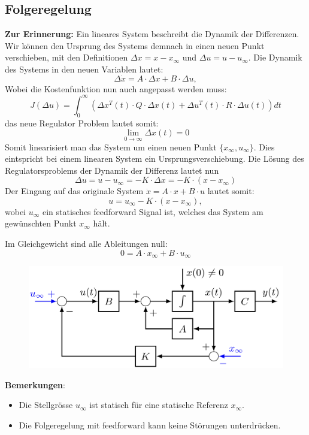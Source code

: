 \subsection{Folgeregelung}
        
        \textbf{Zur Erinnerung:} Ein lineares System beschreibt die Dynamik der Differenzen. Wir können den Ursprung des Systems demnach in einen neuen Punkt verschieben, mit den Definitionen $\Delta x = x -x_\infty$ und $\Delta u = u - u_\infty.$ Die Dynamik des Systems in den neuen Variablen lautet:
        \[\Delta\dot x = A \cdot \Delta x + B \cdot \Delta u,\]
        Wobei die Kostenfunktion nun auch angepasst werden muss:
        \[J(\Delta u) = \int^\infty_0(\Delta x^T(t) \cdot Q \cdot \Delta x(t) + \Delta u^T(t) \cdot R \cdot \Delta u(t)) dt \]
        das neue Regulator Problem lautet somit: 
        \[\lim\limits_{0 \to \infty} \Delta x(t) = 0 \]
        Somit linearisiert man das System um einen neuen Punkt $\{x_\infty,u_\infty\}$. Dies eintspricht bei einem linearen System ein Ursprungsverschiebung. Die Lösung des Regulatorsproblems der Dynamik der Differenz lautet nun
        \[\Delta u = u - u _\infty = -K \cdot \Delta x = -K \cdot ( x-x_\infty)\]
        Der Eingang auf das originale System $\dot x = A\cdot x + B \cdot u$ lautet somit:
        \[u = u_\infty - K \cdot (x-x_\infty),\]
        wobei $u_\infty$ ein statisches feedforward Signal ist, welches das System am gewünschten Punkt $x_\infty$ hält. 
        
        Im Gleichgewicht sind alle Ableitungen null: \[ 0 = A\cdot x_{\infty} + B \cdot u_\infty\]
        
        \begin{figure}[H]
            \centering
            \includegraphics[width = 0.6\linewidth]{images/08/LQR_Folgeregelung.jpeg}
        \end{figure}
        
        \textbf{Bemerkungen}:
        \begin{itemize}
            \item Die Stellgrösse $u_\infty$ ist statisch für eine statische Referenz $x_\infty$. 
            \item Die Folgeregelung mit feedforward kann keine Störungen unterdrücken.
            \end{itemize}